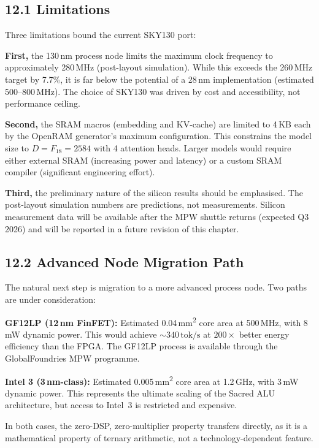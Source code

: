 \subsection{12.1 Limitations}

Three limitations bound the current SKY130 port:

\textbf{First,} the 130\,nm process node limits the maximum clock
frequency to approximately 280\,MHz (post-layout simulation). While
this exceeds the 260\,MHz target by 7.7\%, it is far below the
potential of a 28\,nm implementation (estimated 500--800\,MHz). The
choice of SKY130 was driven by cost and accessibility, not performance
ceiling.

\textbf{Second,} the SRAM macros (embedding and KV-cache) are limited
to 4\,KB each by the OpenRAM generator's maximum configuration. This
constrains the model size to \(D = F_{18} = 2584\) with 4 attention
heads. Larger models would require either external SRAM (increasing
power and latency) or a custom SRAM compiler (significant engineering
effort).

\textbf{Third,} the preliminary nature of the silicon results should
be emphasised. The post-layout simulation numbers are predictions, not
measurements. Silicon measurement data will be available after the
MPW shuttle returns (expected Q3\,2026) and will be reported in a
future revision of this chapter.

\subsection{12.2 Advanced Node Migration Path}

The natural next step is migration to a more advanced process node.
Two paths are under consideration:

\textbf{GF12LP (12\,nm FinFET):} Estimated 0.04\,mm\textsuperscript{2}
core area at 500\,MHz, with 8\,mW dynamic power. This would achieve
\(\sim 340\,\text{tok/s}\) at \(200\times\) better energy efficiency
than the FPGA. The GF12LP process is available through the
GlobalFoundries MPW programme.

\textbf{Intel 3 (3\,nm-class):} Estimated 0.005\,mm\textsuperscript{2}
core area at 1.2\,GHz, with 3\,mW dynamic power. This represents the
ultimate scaling of the Sacred ALU architecture, but access to Intel~3
is restricted and expensive.

In both cases, the zero-DSP, zero-multiplier property transfers
directly, as it is a mathematical property of ternary arithmetic, not
a technology-dependent feature.

